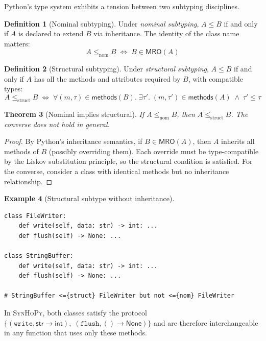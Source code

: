 \documentclass[11pt,a4paper]{report}
\theoremstyle{definition}
\newtheorem{definition}{Definition}[chapter]
\newtheorem{example}[definition]{Example}
\theoremstyle{plain}
\newtheorem{theorem}[definition]{Theorem}
\newcommand{\PyNone}{\mathsf{None}}
\newcommand{\MRO}{\mathsf{MRO}}
\newcommand{\synhopy}{\textsc{SynHoPy}}
\begin{document}
Python's type system exhibits a tension between two subtyping disciplines.

\begin{definition}[Nominal subtyping]
Under \emph{nominal subtyping}, $A \leq B$ if and only if $A$ is declared to
extend $B$ via inheritance. The identity of the class name matters:
\[
  A \leq_{\mathrm{nom}} B \;\Longleftrightarrow\; B \in \MRO(A)
\]
\end{definition}

\begin{definition}[Structural subtyping]
Under \emph{structural subtyping}, $A \leq B$ if and only if $A$ has all the
methods and attributes required by $B$, with compatible types:
\[
  A \leq_{\mathrm{struct}} B \;\Longleftrightarrow\;
  \forall (m, \tau) \in \mathsf{methods}(B).\;
  \exists \tau'.\; (m, \tau') \in \mathsf{methods}(A) \;\wedge\; \tau' \leq \tau
\]
\end{definition}

\begin{theorem}[Nominal implies structural]
If $A \leq_{\mathrm{nom}} B$, then $A \leq_{\mathrm{struct}} B$.
The converse does not hold in general.
\end{theorem}
\begin{proof}
By Python's inheritance semantics, if $B \in \MRO(A)$, then $A$ inherits all
methods of $B$ (possibly overriding them). Each override must be type-compatible
by the Liskov substitution principle, so the structural condition is satisfied.
For the converse, consider a class with identical methods but no inheritance
relationship.
\end{proof}

\begin{example}[Structural subtype without inheritance]
\begin{lstlisting}[style=python]
class FileWriter:
    def write(self, data: str) -> int: ...
    def flush(self) -> None: ...

class StringBuffer:
    def write(self, data: str) -> int: ...
    def flush(self) -> None: ...

# StringBuffer <={struct} FileWriter but not <={nom} FileWriter
\end{lstlisting}
In \synhopy{}, both classes satisfy the protocol
$\{(\mathtt{write}, \mathsf{str} \to \mathsf{int}),\;
  (\mathtt{flush}, () \to \PyNone)\}$
and are therefore interchangeable in any function that uses only these methods.
\end{example}
\end{document}
